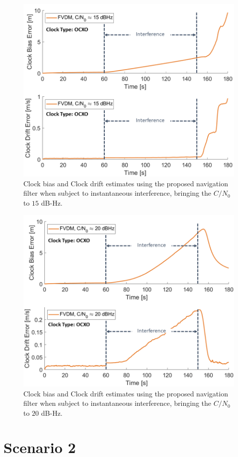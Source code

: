 \begin{figure}[!ht]
    \centering
    \includegraphics[width=0.75\linewidth]{Figures/Results/trajectoryfigure/Slide20.PNG}
    \caption{Clock bias and Clock drift estimates using the proposed navigation filter when subject to instantaneous interference, bringing the \(C/N_0\) to \(15\) dB-Hz.}\label{fig:Clk15}
\end{figure}

\begin{figure}[!ht]
    \centering
    \includegraphics[width=0.75\linewidth]{Figures/Results/trajectoryfigure/Slide21.PNG}
    \caption{Clock bias and Clock drift estimates using the proposed navigation filter when subject to instantaneous interference, bringing the \(C/N_0\) to \(20\) dB-Hz.}\label{fig:Clk20}
\end{figure}

\section{\textbf{Scenario 2}}

